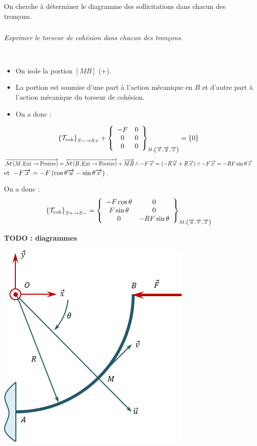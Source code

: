 \documentclass[10pt,fleqn]{article} %
\begin{document}
\begin{multicols}{2}
On cherche à déterminer le diagramme des sollicitations dans chacun des tronçons.

\subparagraph{}
\textit{Exprimer le torseur de cohésion dans chacun des tronçons.}
\ifprof
\begin{corrige}
 ~\\
\begin{itemize}[label=,font=\color{ocre}] 
\item On isole la portion $[MB]$ (+).
\item La portion est soumise d'une part à l'action mécanique en $B$ et d'autre part à l'action mécanique du torseur de cohésion.
\item On a donc : 
\end{itemize}
$$
\torseurscoh_{S-\rightarrow S+} +
 \torseurcol{-F}{0}{0}{0}{0}{0}{B,\left( \vect{x},\vect{y},\vect{z} \right)} 
 = \{0\}
$$
%
$\vectm{M}{\text{Ext}}{\text{Poutre}}
=\vectm{B}{\text{Ext}}{\text{Poutre}} + \vect{MB}  \wedge -F \vect{x} 
=\left( -R\vect{u} + R\vect{x}\right) \wedge -F \vect{x} 
=  - RF \sin \theta \vect{z}
$  et $-F \vect{x}  = -F \left( \cos \theta \vect{u}-\sin \theta \vect{v} \right) $.

On a donc :
$$
\torseurscoh_{S+\rightarrow S-} 
= 
 \torseurcol{-F\cos \theta }{F\sin \theta }{0}{0}{0}{ - RF \sin \theta}{M,\left( \vect{u},\vect{v},\vect{z} \right)} 
$$

\textbf{TODO : diagrammes}
\end{corrige}
\else 
\fi


\ifprof
\else
\begin{center}
\includegraphics[width=.4\textwidth]{images/exo_04}
\end{center}
\fi



\end{multicols}
\end{document}
